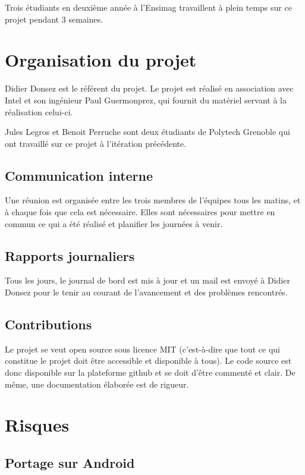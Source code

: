 \documentclass[a4paper,12pt]{article}
\begin{document}
Trois étudiants en deuxième année à l'Ensimag travaillent à plein temps sur ce
projet pendant 3 semaines.

\section{Organisation du projet}

Didier Donsez est le référent du projet.
Le projet est réalisé en association avec Intel et son ingénieur Paul Guermonprez, qui
fournit du matériel servant à la réalisation celui-ci.

Jules Legros et Benoit Perruche sont deux étudiants de Polytech Grenoble qui
ont travaillé sur ce projet à l'itération précédente.

\subsection{Communication interne}

Une réunion est organisée entre les trois membres de l'équipes tous les matins,
et à chaque fois que cela est nécessaire. Elles sont nécessaires pour mettre en
commun ce qui a été réalisé et planifier les journées à venir.

\subsection{Rapports journaliers}

Tous les jours, le journal de bord est mis à jour et un mail est envoyé à
Didier Donsez pour le tenir au courant de l'avancement et des problèmes
rencontrés.

\subsection{Contributions}

Le projet se veut open source sous licence MIT (c'est-à-dire que tout ce qui constitue le projet
doit être accessible et disponible à tous). Le code source est donc disponible
sur la plateforme github et se doit d'être commenté et clair. De même, une
documentation élaborée est de rigueur.

\section{Risques}

\subsection{Portage sur Android}
\end{document}
